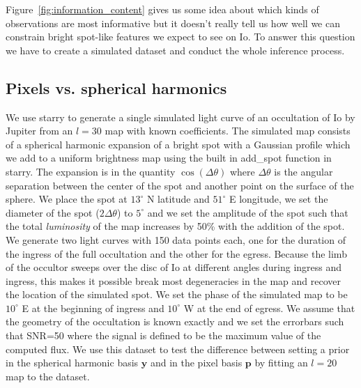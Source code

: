 \documentclass[modern]{aastex62}
\begin{document}
Figure~\ref{fig:information_content} gives us some idea about which kinds of observations are most informative but it doesn't really tell us how well we can constrain bright spot-like features we expect to see on Io.
To answer this question we have to create a simulated dataset and conduct the whole inference process.

\subsection{Pixels vs. spherical harmonics}
\label{ssec:pixels_vs_harmonics}
We use \textsf{starry} to generate a single simulated light curve of an occultation of Io by Jupiter from an $l=30$ map with known coefficients.
The simulated map consists of a spherical harmonic expansion of a bright spot with a Gaussian profile which we add to a uniform brightness map using the built in \textsf{add\_spot} function in \textsf{starry}.
The expansion is in the quantity $\cos(\Delta\theta)$ where $\Delta\theta$ is the angular separation between the center of the spot and another point on the surface of the sphere. 
We place the spot at $13^\circ$ N latitude and $51^\circ$ E longitude, we set the diameter of the spot ($2\Delta\theta$) to $5^\circ$ and we set the amplitude of the spot such that the total \emph{luminosity} of the map increases by 50\% with the addition of the spot.
We generate two light curves with 150 data points each, one for the duration of the ingress of the full occultation and the other for the egress.
Because the limb of the occultor sweeps over the disc of Io at different angles during ingress and ingress, this makes it possible break most degeneracies in the map and recover the location of the simulated spot.
We set the phase of the simulated map to be $10^\circ$ E at the beginning of ingress and $10^\circ$ W at the end of egress.
We assume that the geometry of the occultation is known exactly and we set the errorbars such that SNR=50 where the signal is defined to be the maximum value of the computed flux.
    We use this dataset to test the difference between setting a prior in the spherical harmonic basis $\mathbf{y}$ and in the pixel basis $\mathbf{p}$ by fitting an $l=20$ map to the dataset.
\end{document}
